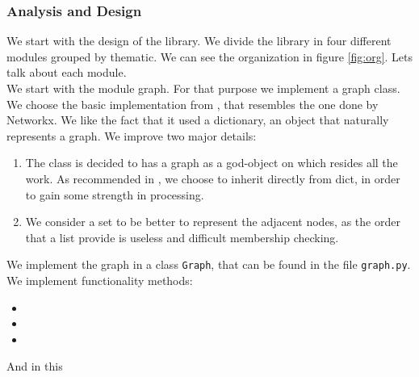\subsubsection{Analysis and Design}

We start with the design of the library. We divide the library in four different modules grouped by thematic. We can see the organization in figure \ref{fig:org}. Lets talk about each module.\\






We start with the module graph. For that purpose we implement a graph class.  We choose the basic implementation from \cite{graphAdvanced}, that resembles the one done by Networkx. We like the fact that it used a dictionary, an object that naturally represents a graph. We improve two major details:
  \begin{enumerate}
  \item The class is decided to has a graph as a god-object on which resides all the work. As recommended in \cite{slatkin2019effective}, we choose to inherit directly from dict, in order to gain some strength in processing.
  \item We consider a set to be better to represent the adjacent nodes, as the order that a list provide is useless and difficult membership checking.
  \end{enumerate}

  We implement the graph in a class \texttt{Graph}, that can be found in the file \texttt{graph.py}. We implement functionality methods:
  \begin{itemize}
  \item
  \item
  \item
  \end{itemize}


  And in this 

  

